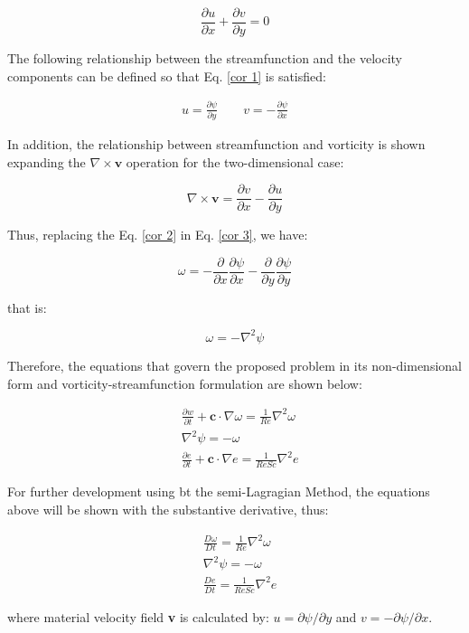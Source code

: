 \begin{equation} \label{cor 1}
 \frac{\partial u}{\partial x}
 +
 \frac{\partial v}{\partial y}
 =
 0
\end{equation}
 
\medskip
The following relationship between the streamfunction and
 the velocity components can be defined so that
 Eq. \ref{cor 1} is satisfied:


\begin{equation} \label{cor 2}
\begin{aligned}
 u = \frac{\partial \psi}{\partial y}
 \qquad
 v = - \frac{\partial \psi}{\partial x}
\end{aligned}
\end{equation}

\medskip
In addition, the relationship between streamfunction
and vorticity is shown expanding the
$\nabla \times \textbf{v}$ operation
for the two-dimensional case:


\begin{equation} \label{cor 3}
 \nabla \times \textbf{v}
 = 
 \frac{\partial v}{\partial x}
 - 
 \frac{\partial u}{\partial y}
\end{equation}

\medskip
\noindent
Thus, replacing the 
Eq. \ref{cor 2} in Eq. \ref{cor 3},
we have:

\begin{equation}
 \omega
 =
 - 
 \frac{\partial}{\partial x} \frac{\partial \psi}{\partial x}
 -
 \frac{\partial}{\partial y} \frac{\partial \psi}{\partial y}
\end{equation}

\medskip
\noindent
that is:

\begin{equation}
 \omega
 = 
 -
 \nabla^{2} \psi
\end{equation}

\medskip
Therefore, the equations that govern the proposed problem
in its non-dimensional form and vorticity-streamfunction formulation
are shown below:

\begin{align}
& \frac{\partial w}{\partial t}
 +
 \textbf{c} \cdot \nabla \omega
 =
 \frac{1}{Re} \nabla^{2} \omega
 \\[10pt] 
& \nabla^{2} \psi
 = 
 - 
 \omega \\[10pt]
& \frac{\partial e}{\partial t}
 +
 \textbf{c} \cdot \nabla e
 =
 \frac{1}{ReSc} \nabla^{2} e
\end{align}

\medskip
For further development using bt the semi-Lagragian Method,
the equations above will be shown with the substantive derivative,
thus:

\begin{align}
& \frac{D \omega}{D t}
 =
 \frac{1}{Re} \nabla^{2} \omega \label{vorticidade}
 \\[10pt] 
& \nabla^{2} \psi
 = 
 - 
 \omega \label{corrente} \\[10pt]
& \frac{D e}{Dt}
 =
 \frac{1}{ReSc} \nabla^{2} e \label{especie quimica}
\end{align}

\medskip
\noindent
where material velocity field \textbf{v} is calculated by:
$u = \partial \psi / \partial y$ and 
$v = - \partial \psi / \partial x$. 
